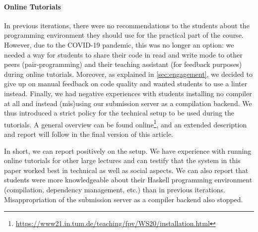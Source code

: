 \paragraph{Online Tutorials}
In previous iterations,
there were no recommendations to the students about the programming environment they should use for the practical part of the course.
However, due to the COVID-19 pandemic,
this was no longer an option:
we needed a way for students to share their code in read and write mode
to other peers (pair-programming) and their teaching assistant (for feedback purposes) during online tutorials.
Moreover, as explained in \cref{sec:engagement},
we decided to give up on manual feedback on code quality
and wanted students to use a linter instead.
Finally, we had negative experiences with students
installing no compiler at all
and instead (mis)using our submission server as a compilation backend.
We thus introduced a strict policy
for the technical setup to be used during
the tutorials.
A general overview can be found online\footnote{\url{https://www21.in.tum.de/teaching/fpv/WS20/installation.html}},
and an extended description and report will follow in the final version of this article.

In short, we can report positively on the setup.
We have experience with running online tutorials for other large lectures and can testify that
the system in this paper worked best in technical as well as social aspects.
We can also report that students were more knowledgeable
about their Haskell programming environment (compilation, dependency management, etc.) than in previous iterations.
Misappropriation of the submission server as a compiler backend also stopped.
